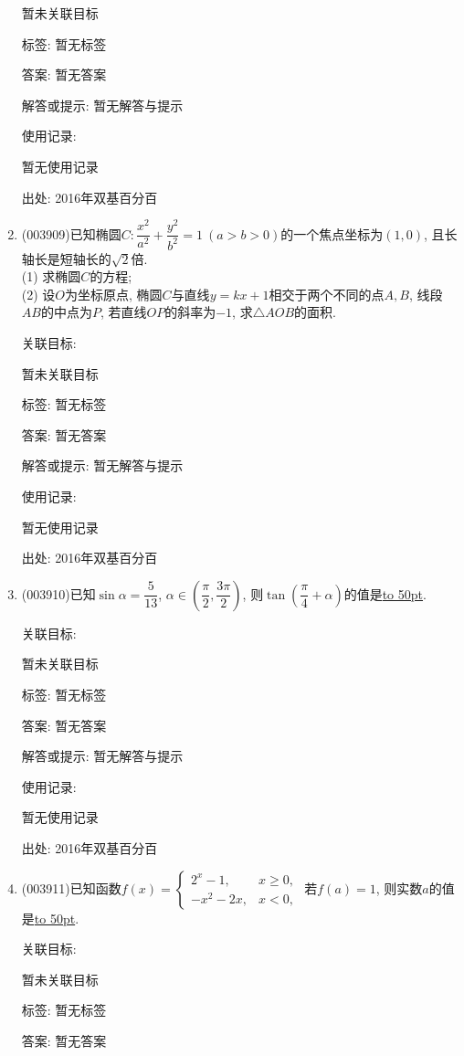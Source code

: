 \documentclass[10pt,a4paper]{article}
\newcommand{\blank}[1]{\underline{\hbox to #1pt{}}}
\begin{document}
\begin{enumerate}[1.]
暂未关联目标



标签: 暂无标签

答案: 暂无答案

解答或提示: 暂无解答与提示

使用记录:

暂无使用记录


出处: 2016年双基百分百
\item { (003909)}已知椭圆$C:\dfrac{x^2}{a^2}+\dfrac{y^2}{b^2}=1 \ (a>b>0)$的一个焦点坐标为$(1,0)$, 且长轴长是短轴长的$\sqrt{2}$倍.\\
(1) 求椭圆$C$的方程;\\
(2) 设$O$为坐标原点, 椭圆$C$与直线$y=kx+1$相交于两个不同的点$A,B$, 线段$AB$的中点为$P$, 若直线$OP$的斜率为$-1$, 求$\triangle AOB$的面积.


关联目标:

暂未关联目标



标签: 暂无标签

答案: 暂无答案

解答或提示: 暂无解答与提示

使用记录:

暂无使用记录


出处: 2016年双基百分百
\item { (003910)}已知$\sin\alpha=\dfrac 5{13}$, $\alpha\in \left(\dfrac{\pi}{2},\dfrac{3\pi}{2}\right)$, 则$\tan\left(\dfrac{\pi}{4}+\alpha\right)$的值是\blank{50}.


关联目标:

暂未关联目标



标签: 暂无标签

答案: 暂无答案

解答或提示: 暂无解答与提示

使用记录:

暂无使用记录


出处: 2016年双基百分百
\item { (003911)}已知函数$f(x)=\begin{cases}
2^x-1, & x\ge 0,\\ -x^2-2x, & x<0,
\end{cases}$ 若$f(a)=1$, 则实数$a$的值是\blank{50}.


关联目标:

暂未关联目标



标签: 暂无标签

答案: 暂无答案


\end{enumerate}
\end{document}
